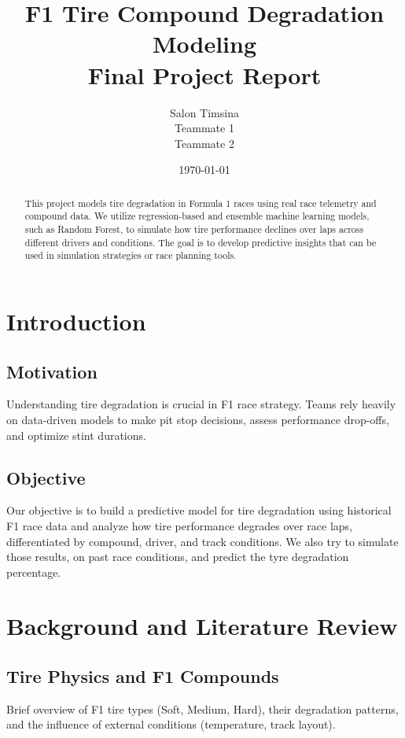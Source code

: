 \documentclass[12pt]{article}
\title{\textbf{F1 Tire Compound Degradation Modeling}\\\large Final Project Report}
\author{Salon Timsina \\ Teammate 1 \\ Teammate 2}
\date{\today}
\begin{document}
\maketitle
\thispagestyle{empty}

\begin{abstract}
This project models tire degradation in Formula 1 races using real race telemetry and compound data. We utilize regression-based and ensemble machine learning models, such as Random Forest, to simulate how tire performance declines over laps across different drivers and conditions. The goal is to develop predictive insights that can be used in simulation strategies or race planning tools.
\end{abstract}

\newpage

\tableofcontents
\newpage

\section{Introduction}
\subsection{Motivation}
Understanding tire degradation is crucial in F1 race strategy. Teams rely heavily on data-driven models to make pit stop decisions, assess performance drop-offs, and optimize stint durations.

\subsection{Objective}
Our objective is to build a predictive model for tire degradation using historical F1 race data and analyze how tire performance degrades over race laps, differentiated by compound, driver, and track conditions.
We also try to simulate those results, on past race conditions, and predict the tyre degradation percentage. 
\section{Background and Literature Review}
\subsection{Tire Physics and F1 Compounds}
Brief overview of F1 tire types (Soft, Medium, Hard), their degradation patterns, and the influence of external conditions (temperature, track layout).
\end{document}
